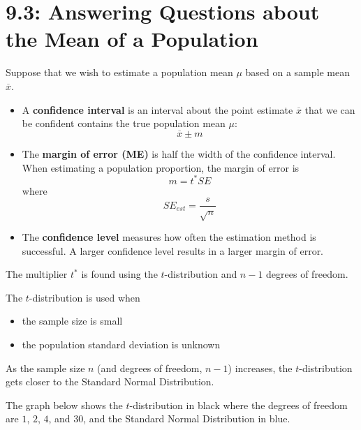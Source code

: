 \documentclass[../mathNotesPreamble]{subfiles}
\begin{document}
  \section{9.3: Answering Questions about the Mean of a Population}
    \begin{defn*}
      Suppose that we wish to estimate a population mean $\mu$ based on a sample mean $\overline{x}$.
      \begin{itemize}
        \item A \textbf{confidence interval} is an interval about the point estimate $\overline{x}$ that we can be confident contains the true population mean $\mu$:
          \[\overline{x}\pm m\]
        \item The \textbf{margin of error (ME)} is half the width of the confidence interval. When estimating a population proportion, the margin of error is
          \[m=t^* SE\]
          where 
          \[SE_{est}=\frac{s}{\sqrt{n}}\]
        \item The \textbf{confidence level} measures how often the estimation method is successful. A larger confidence level results in a larger margin of error.
      \end{itemize}
    \end{defn*}
    \vspace*{2\baselineskip}
    
    The multiplier $t^*$ is found using the $t$-distribution and $n-1$ degrees of freedom.
    \pagebreak
    
    The $t$-distribution is used when
    \begin{itemize}
      \item the sample size is small %
      \item the population standard deviation is unknown
    \end{itemize}
    As the sample size $n$ (and degrees of freedom, $n-1$) increases, the $t$-distribution gets closer to the Standard Normal Distribution. 
    
    The graph below shows the $t$-distribution in black where the degrees of freedom are $1$, $2$, $4$, and $30$, and the Standard Normal Distribution in blue.
\end{document}
